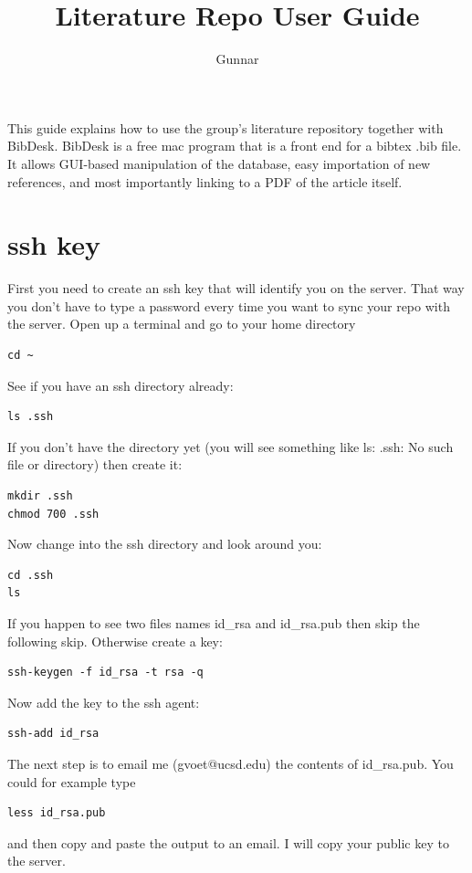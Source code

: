 \documentclass[11pt, oneside]{article}   	%
\title{Literature Repo User Guide}
\author{Gunnar}
\begin{document}
\maketitle

This guide explains how to use the group's literature repository together with BibDesk. BibDesk is a free mac program that is a front end for a bibtex .bib file.  It allows GUI-based manipulation of the database, easy importation of new references, and most importantly linking to a PDF of the article itself.

\section{ssh key}
First you need to create an ssh key that will identify you on the server. That way you don't have to type a password every time you want to sync your repo with the server. Open up a terminal and go to your home directory
\begin{verbatim}
cd ~
\end{verbatim}
See if you have an ssh directory already:
\begin{verbatim}
ls .ssh
\end{verbatim}
If you don't have the directory yet (you will see something like ls: .ssh: No such file or directory) then create it:
\begin{verbatim}
mkdir .ssh
chmod 700 .ssh
\end{verbatim}
Now change into the ssh directory and look around you:
\begin{verbatim}
cd .ssh
ls
\end{verbatim}
If you happen to see two files names id\_rsa and id\_rsa.pub then skip the following skip. Otherwise create a key:
\begin{verbatim}
ssh-keygen -f id_rsa -t rsa -q
\end{verbatim}
Now add the key to the ssh agent:
\begin{verbatim}
ssh-add id_rsa
\end{verbatim}
The next step is to email me (gvoet@ucsd.edu) the contents of id\_rsa.pub. You could for example type
\begin{verbatim}
less id_rsa.pub
\end{verbatim}
and then copy and paste the output to an email. I will copy your public key to the server.
\end{document}
